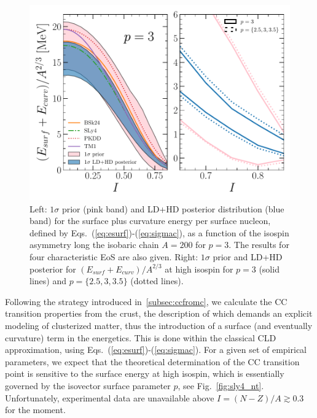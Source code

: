 \begin{figure}[!t]
  \begin{center}
    \includegraphics[width=0.9\linewidth]{figures/surf_bayes.pdf}
  \end{center}
  \caption[Prior and posterior distribution for the surface plus curvature
  energy per surface nucleon versus isospin asymmetry]{Left: $1\sigma$ prior
    (pink band) and LD+HD posterior distribution (blue band) for the surface 
    plus curvature energy per surface nucleon, defined by 
    Eqs.~(\ref{eq:esurf})-(\ref{eq:sigmac}), as a 
    function of the isospin asymmetry long the isobaric chain $A=200$ for
    $p=3$. The results for four characteristic EoS are also given. 
    Right: $1\sigma$ prior and LD+HD posterior for 
    $(E_{surf} + E_{curv})/A^{2/3}$ at high isospin for $p=3$ (solid lines) and 
  $p=\{2.5,3,3.5\}$ (dotted lines).}\label{fig:surf_bayes}
\end{figure}

Following the strategy introduced in~\ref{subsec:ccfromc}, we calculate the CC 
transition properties from the crust, the description of which demands an
explicit modeling of clusterized matter, thus the introduction of a surface
(and eventually curvature) term in the energetics. This is done 
within the classical CLD approximation, using
Eqs.~(\ref{eq:esurf})-(\ref{eq:sigmac}). For a given set of empirical
parameters, we expect that the theoretical determination of the CC transition 
point is sensitive to the surface energy at high isospin, which is essentially 
governed by the isovector surface parameter $p$, see Fig.~\ref{fig:sly4_nt}.
Unfortunately, experimental data are unavailable above $I = (N-Z)/A \gtrsim 
0.3$ for the moment.

